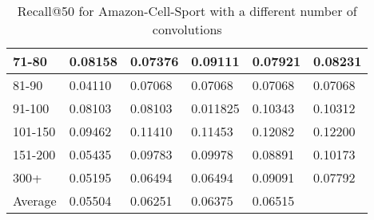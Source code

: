 \begin{table}[]
\begin{tabular}{|l|l|l|l|l|l|}
    71-80     & 0.08158                    & 0.07376                    & 0.09111                    & 0.07921                    & 0.08231                    \\ \hline
    81-90     & 0.04110                    & 0.07068                    & 0.07068                    & 0.07068                    & 0.07068                    \\ \hline
    91-100    & 0.08103                    & 0.08103                    & 0.011825                   & 0.10343                    & 0.10312                    \\ \hline
    101-150   & 0.09462                    & 0.11410                    & 0.11453                    & 0.12082                    & 0.12200                    \\ \hline
    151-200   & 0.05435                    & 0.09783                    & 0.09978                    & 0.08891                    & 0.10173                    \\ \hline
    300+      & 0.05195                    & 0.06494                    & 0.06494                    & 0.09091                    & 0.07792                    \\ \hline
    Average   & 0.05504                    & 0.06251                    & 0.06375                    & 0.06515                    &                    \\ \hline
    \end{tabular}
    \caption{Recall@50 for Amazon-Cell-Sport with a different number of convolutions}
    \label{tab:Amazon-Cell-Sport-recall-evaluation-mean}
\end{table}

